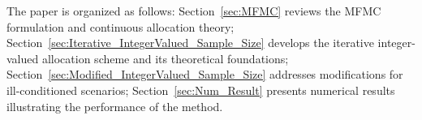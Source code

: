 The paper is organized as follows: Section~\ref{sec:MFMC} reviews the MFMC formulation and continuous allocation theory; Section~\ref{sec:Iterative_IntegerValued_Sample_Size} develops the iterative integer-valued allocation scheme and its theoretical foundations; Section~\ref{sec:Modified_IntegerValued_Sample_Size} addresses modifications for ill-conditioned scenarios; Section~\ref{sec:Num_Result} presents numerical results illustrating the performance of the method.









